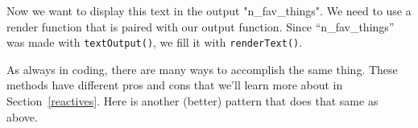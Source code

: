 \documentclass[
  oneside]{book}
\newenvironment{Shaded}{\begin{snugshade}}{\end{snugshade}}
\newcommand{\CommentTok}[1]{\textcolor[rgb]{0.56,0.35,0.01}{\textit{#1}}}
\newcommand{\ControlFlowTok}[1]{\textcolor[rgb]{0.13,0.29,0.53}{\textbf{#1}}}
\newcommand{\FunctionTok}[1]{\textcolor[rgb]{0.00,0.00,0.00}{#1}}
\newcommand{\NormalTok}[1]{#1}
\newcommand{\OtherTok}[1]{\textcolor[rgb]{0.56,0.35,0.01}{#1}}
\newcommand{\SpecialCharTok}[1]{\textcolor[rgb]{0.00,0.00,0.00}{#1}}
\newcommand{\StringTok}[1]{\textcolor[rgb]{0.31,0.60,0.02}{#1}}
\begin{document}
\begin{Shaded}
\end{Shaded}

Now we want to display this text in the output \StringTok{"n\_fav\_things"}. We need to use a render function that is paired with our output function. Since ``n\_fav\_things'' was made with \texttt{textOutput}\texttt{()}, we fill it with \texttt{renderText}\texttt{()}.

\begin{Shaded}
\end{Shaded}

As always in coding, there are many ways to accomplish the same thing. These methods have different pros and cons that we'll learn more about in Section~\ref{reactives}. Here is another (better) pattern that does that same as above.
\end{document}
